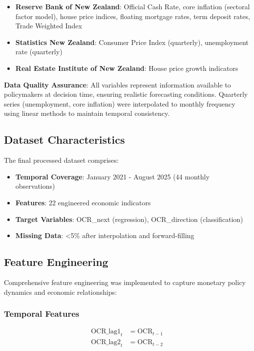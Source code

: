 \documentclass[11pt,a4paper]{article}
\begin{document}
	\begin{itemize}
		\item \textbf{Reserve Bank of New Zealand}: Official Cash Rate, core inflation (sectoral factor model), house price indices, floating mortgage rates, term deposit rates, Trade Weighted Index
		\item \textbf{Statistics New Zealand}: Consumer Price Index (quarterly), unemployment rate (quarterly)  
		\item \textbf{Real Estate Institute of New Zealand}: House price growth indicators
	\end{itemize}
	
	\textbf{Data Quality Assurance}: All variables represent information available to policymakers at decision time, ensuring realistic forecasting conditions. Quarterly series (unemployment, core inflation) were interpolated to monthly frequency using linear methods to maintain temporal consistency.
	
	\subsection{Dataset Characteristics}
	The final processed dataset comprises:
	\begin{itemize}
		\item \textbf{Temporal Coverage}: January 2021 - August 2025 (44 monthly observations)
		\item \textbf{Features}: 22 engineered economic indicators
		\item \textbf{Target Variables}: OCR\_next (regression), OCR\_direction (classification)
		\item \textbf{Missing Data}: <5\% after interpolation and forward-filling
	\end{itemize}
	
	\subsection{Feature Engineering}
	Comprehensive feature engineering was implemented to capture monetary policy dynamics and economic relationships:
	
	\subsubsection{Temporal Features}
	\begin{align}
		\text{OCR\_lag1}_t &= \text{OCR}_{t-1} \\
		\text{OCR\_lag2}_t &= \text{OCR}_{t-2}
	\end{align}
	
\end{document}
